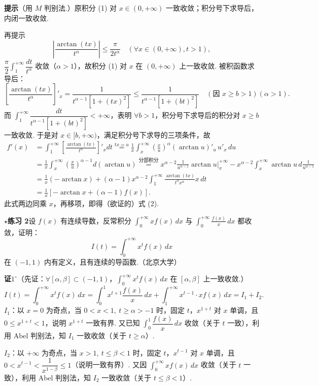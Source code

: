 \documentclass[UTF8,12pt,a4paper,fontset=fandol]{ctexart}
\begin{document}
\noindent\textbf{提示}\quad （用 $M$ 判别法.）原积分 (1) 对 $x\in(0,+\infty)$ 一致收敛；积分号下求导后，内闭一致收敛.

再提示
\[
\left|\frac{\arctan(tx)}{t^\alpha}\right|\le\frac{\pi}{2t^\alpha}\quad(\forall x\in(0,+\infty),t>1),
\]
$\dfrac{\pi}{2}\displaystyle\int_1^{+\infty}\dfrac{dt}{t^\alpha}$ 收敛（$\alpha>1$），故积分 (1) 对 $x$ 在 $(0,+\infty)$ 上一致收敛. 被积函数求导后：
\[
\left[\frac{\arctan(tx)}{t^\alpha}\right]'_x
=\frac1{t^{\alpha-1}[1+(tx)^2]}
\le\frac1{t^{\alpha-1}[1+(bt)^2]}\quad(\text{因 }x\ge b>1)(\alpha>1).
\]
而 $\displaystyle\int_1^{+\infty}\dfrac{dt}{t^{\alpha-1}[1+(bt)^2]}<+\infty$，表明 $\forall b>1$，积分号下求导后的积分对 $x\ge b$ 一致收敛. 于是对 $x\in[b,+\infty)$，满足积分号下求导的三项条件，故
\[
\begin{aligned}
f'(x)
&=\int_1^{+\infty}\left[\frac{\arctan(tx)}{t^\alpha}\right]'_xdt
\overset{tx=u}{=}\frac1x\int_x^{+\infty}\left(\frac xu\right)^\alpha(\arctan u)'_u\,u'_x\,du\\
&=\frac1x\int_x^{+\infty}\left(\frac xu\right)^{\alpha-1}d(\arctan u)
\overset{\text{分部积分}}{=}x^{\alpha-2}\frac1{u^{\alpha-1}}\arctan u\bigg|_x^{+\infty}
-x^{\alpha-2}\int_x^{+\infty}\arctan u\,d\frac1{u^{\alpha-1}}\\
&=\frac1x(-\arctan x)+(\alpha-1)x^{\alpha-2}\int_1^{+\infty}\frac{\arctan(tx)}{t^\alpha x^\alpha}x\,dt\\
&=\frac1x[-\arctan x+(\alpha-1)f(x)].
\end{aligned}
\]
此式两边同乘 $x$，再移项，即得（欲证的）式 (2).

\noindent\textbf{$\star$练习 2}\quad 设 $f(x)$ 有连续导数，反常积分 $\displaystyle\int_0^{+\infty}xf(x)\,dx$ 与 $\displaystyle\int_0^{+\infty}\frac{f(x)}x\,dx$ 都收敛，证明：
\[
I(t)=\int_0^{+\infty}x^tf(x)\,dx
\]
在 $(-1,1)$ 内有定义，且有连续的导函数.（北京大学）

\noindent\textbf{证}\quad $1^\circ$（先证：$\forall[\alpha,\beta]\subset(-1,1)$，$\displaystyle\int_0^{+\infty}x^tf(x)\,dx$ 在 $[\alpha,\beta]$ 上一致收敛.）
\[
I(t)=\int_0^{+\infty}x^tf(x)\,dx
=\int_0^1x^{t+1}\frac{f(x)}x\,dx+\int_1^{+\infty}x^{t-1}\cdot xf(x)\,dx=I_1+I_2.
\]
$I_1$：以 $x=0$ 为奇点，当 $0<x<1,\ t\ge\alpha>-1$ 时，固定 $t$，$x^{1+t}$ 对 $x$ 单调，且 $0\le x^{1+t}<1$，说明 $x^{1+t}$ 一致有界. 又已知 $\displaystyle\int_0^1\dfrac{f(x)}x\,dx$ 收敛（关于 $t$ 一致），利用 Abel 判别法，知 $I_1$ 一致收敛（关于 $t\ge\alpha$）.

$I_2$：以 $+\infty$ 为奇点，当 $x>1,\ t\le\beta<1$ 时，固定 $t$，$x^{t-1}$ 对 $x$ 单调，且 $0<x^{t-1}<\dfrac1{x^{1-\beta}}\le1$（说明一致有界）. 又因 $\displaystyle\int_0^{+\infty}xf(x)\,dx$ 收敛（关于 $t$ 一致），利用 Abel 判别法，知 $I_2$ 一致收敛（关于 $t\le\beta<1$）.
\end{document}
